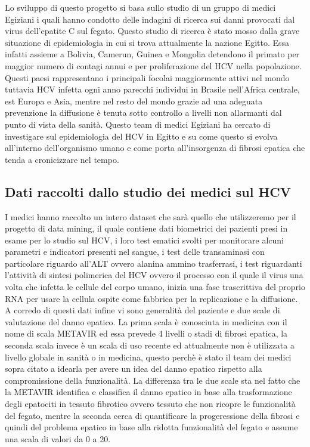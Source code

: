 \documentclass[italian,12pt,a4paper]{article}
\begin{document}
    Lo sviluppo di questo progetto si basa sullo studio di un gruppo di medici Egiziani i quali hanno condotto delle indagini di ricerca sui danni provocati dal virus dell'epatite C sul fegato. Questo studio di ricerca è stato mosso dalla grave situazione di epidemiologia in cui si trova attualmente la nazione Egitto. Essa infatti assieme a Bolivia, Camerun, Guinea e Mongolia detendono il primato per maggior numero di contagi annui e per proliferazione del HCV nella popolazione. Questi paesi rappresentano i principali focolai maggiormente attivi nel mondo tuttavia HCV infetta ogni anno parecchi individui in Brasile nell'Africa centrale, est Europa e Asia, mentre nel resto del mondo grazie ad una adeguata prevenzione la diffusione è tenuta sotto controllo a livelli non allarmanti dal punto di vista della sanità. Questo team di medici Egiziani ha cercato di investigare sul epidemiologia del HCV in Egitto e su come questo si evolva all'interno dell'organismo umano e come porta all'insorgenza di fibrosi epatica che tenda a cronicizzare nel tempo.
    \\
	
	\subsection{Dati raccolti dallo studio dei medici sul HCV}
	I medici hanno raccolto un intero dataset che sarà quello che utilizzeremo per il progetto di data mining, il quale contiene dati biometrici dei pazienti presi in esame per lo studio sul HCV, i loro test ematici svolti per monitorare alcuni parametri e indicatori presenti nel sangue, i test delle transaminasi con particolare riguardo all'ALT ovvero alanina ammino trasferrasi, i test riguardanti l'attività di sintesi polimerica del HCV ovvero il processo con il quale il virus una volta che infetta le cellule del corpo umano, inizia una fase trascrittiva del proprio RNA per usare la cellula ospite come fabbrica per la replicazione e la diffusione. A corredo di questi dati infine vi sono generalità del paziente e due scale di valutazione del danno epatico. La prima scala è conosciuta in medicina con il nome di scala METAVIR ed essa prevede 4 livelli o stadi di fibrosi epatica, la seconda scala invece è un scala di uso recente ed attualmente non è utilizzata a livello globale in sanità o in medicina, questo perchè è stato il team dei medici sopra citato a idearla per avere un idea del danno epatico rispetto alla compromissione della funzionalità. La differenza tra le due scale sta nel fatto che la METAVIR identifica e classifica il danno epatico in base alla trasformazione degli epatociti in tessuto fibrotico ovvero tessuto che non ricopre le funzionalità del fegato, mentre la seconda cerca di quantificare la progeressione della fibrosi e quindi del problema epatico in base alla ridotta funzionalità del fegato e assume una scala di valori da 0 a 20.
\end{document}
